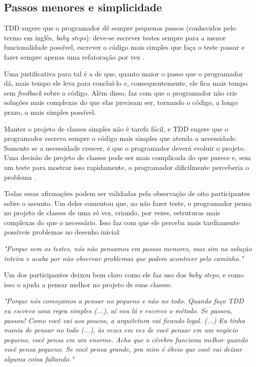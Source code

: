 \subsection{Passos menores e simplicidade}

TDD sugere que o programador dê sempre pequenos passos (conhecidos pelo termo em
inglês, \textit{baby steps}): deve-se escrever testes sempre para a menor
funcionalidade possível, escrever o código mais simples que faça o teste passar
e fazer sempre apenas uma refatoração por vez \cite{TDDByExample}.

Uma justificativa para tal é a de que, quanto maior o passo que o programador dá, mais
tempo ele leva para concluí-lo e, consequentemente, ele fica mais tempo
sem \textit{feedback} sobre o código. Além disso, faz com que o programador não crie
soluções mais complexas do que elas precisam ser, tornando o código, a longo
prazo, o mais simples possível.

Manter o projeto de classes simples não é tarefa fácil, e TDD sugere que o programador
escreva sempre o código mais simples que atenda a necessidade. Somente se a
necessidade crescer, é que o programador deverá evoluir o projeto. Uma decisão de
projeto de classes pode ser mais complicada do que parece e, sem um teste para mostrar isso
rapidamente, o programador dificilmente perceberia o problema \cite{aim-fire}.

Todas essas afirmações podem ser validadas pela observação de oito participantes sobre o assunto.
Um deles comentou que,
ao não fazer teste, o programador pensa no projeto de classes de uma só vez, criando, por vezes,
estruturas mais complexas do que o necessário. Isso faz com que ele perceba mais tardiamente
possíveis problemas no desenho inicial:

\begin{framed}
\textit{"Porque sem os testes, nós não pensamos em passos menores, mas sim na solução inteira
e acaba por não observar problemas que podem acontecer pelo caminho."}
\end{framed}

Um dos participantes deixou bem claro como ele faz uso dos \textit{baby steps}, e como
isso o ajuda a pensar melhor no projeto de suas classes:

\begin{framed}
\textit{"Porque nós começamos a pensar no pequeno e não no todo. Quando faço TDD eu escrevo
uma regra simples (...), aí vou lá e escrevo o método. Se passou, passou! Como você vai aos poucos,
a arquitetura vai ficando legal. (...) Eu tinha mania de pensar no todo (...), às vezes
em vez de você pensar em um negócio pequeno, você pensa em um enorme. Acho que o cérebro funciona
melhor quando você pensa pequeno. Se você pensa grande, pra mim é óbvio que você vai deixar
alguma coisa faltando."}
\end{framed}

